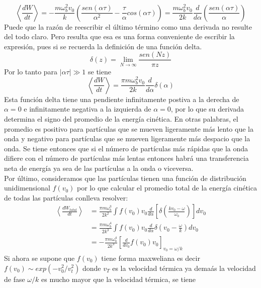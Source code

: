 \begin{equation}
\label{eq:promedio_w_segunda}
\left\langle \frac{dW}{dt}\right\rangle= -\frac{m\omega_b^2v_0}{k}\left(\frac{sen(\alpha\tau)}{\alpha^2}-\frac{\tau}{\alpha}cos(\alpha\tau)\right)= \frac{m\omega_b^2v_0}{2k}\frac{d}{d\alpha}\left(\frac{sen(\alpha\tau)}{\alpha}\right)
\end{equation}
Puede que la razón de reescribir el último término como una derivada no resulte del todo claro. Pero resulta que esa es una forma conveniente de escribir la expresión, pues si se recuerda la definición de una función delta.
\begin{equation}
\label{eq:delta_function_definition}
\delta (z) =\lim_{N\to\infty}\frac{sen(Nz)}{\pi z}
\end{equation}
Por lo tanto para $|\alpha\tau| \gg 1$ se tiene
\begin{equation}
\label{eq:promedio_w_tercera}
\left\langle \frac{dW}{dt}\right\rangle=\frac{\pi m\omega_b^2v_0}{2k}\frac{d}{d\alpha}\delta(\alpha)
\end{equation}
Esta función delta tiene una pendiente infinitamente postiva a la derecha de $\alpha=0$ e infinitamente negativa a la izquierda de $\alpha=0$, por lo que su derivada determina el signo del promedio de la energía cinética. En otras palabras, el promedio es positivo para partículas que se mueven ligeramente más lento que la onda y negativo para partículas que se mueven ligeramente más despacio que la onda. Se tiene entonces que si el número de partículas más rápidas que la onda difiere con el número de partículas más lentas entonces habrá una transferencia neta de energía ya sea de las partículas a la onda o viceversa.\\
Por último, consideramos que las partículas tienen una función de distribución unidimensional $f(v_0)$ por lo que calcular el promedio total de la energía cinética de todas las partículas conlleva resolver:
\begin{align}
\left\langle \frac{dW_{total}}{dt}\right\rangle &=  \frac{\pi m\omega_b^3}{2k^2}\int f(v_0)v_0\frac{d}{d\alpha}\left[\delta\left(\frac{kv_0-\omega}{\omega_b}\right)\right]dv_0\\
&=\frac{\pi m\omega_b^4}{2k^3}\int f(v_0)v_0\frac{d}{d\alpha}\delta \left(v_0 -\frac{\omega}{k}\right)dv_0\\
&=-\frac{\pi m\omega_b^4}{2k^3}\left[\frac{d}{dv_0}f(v_0)v_0\right]_{v_0=\omega /k}
\end{align}
Si ahora se supone que $f(v_0)$ tiene forma maxweliana es decir $f(v_0)\sim exp(-v_0^2/v_t^2)$ donde $v_T$ es la velocidad térmica ya demaás la velocidad de fase $\omega /k$ es mucho mayor que la velocidad térmica, se tiene
